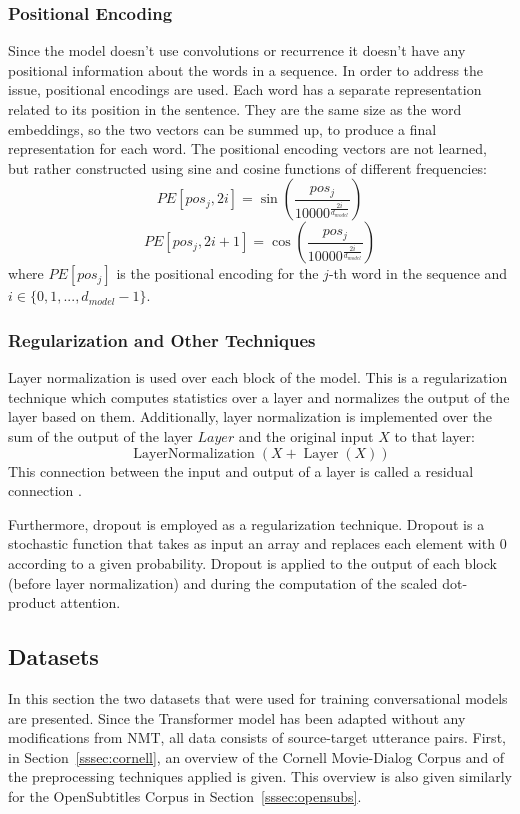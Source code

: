 \documentclass[12pt]{article}
\DeclareMathOperator{\Layer}{Layer}
\DeclareMathOperator{\LayerNormalization}{LayerNormalization}
\begin{document}
\subsubsection{Positional Encoding} \label{sssec:positional}
Since the model doesn't use convolutions or recurrence it doesn't have any positional information about the words in a sequence. In order to address the issue, positional encodings are used. Each word has a separate representation related to its position in the sentence. They are the same size as the word embeddings, so the two vectors can be summed up, to produce a final representation for each word. The positional encoding vectors are not learned, but rather constructed using sine and cosine functions of different frequencies:
\begin{equation}
PE[pos_j,2i]=\sin\left(\frac{pos_j}{10000^{\frac{2i}{d_{model}}}}\right)
\end{equation}
\begin{equation}
PE[pos_j,2i+1]=\cos\left(\frac{pos_j}{10000^{\frac{2i}{d_{model}}}}\right) 
\end{equation}
where \(PE[pos_j]\) is the positional encoding for the \(j\)-th word in the sequence and \(i \in \{0,1,...,d_{model}-1\}\).

\subsubsection{Regularization and Other Techniques} \label{sssec:regularization}
Layer normalization \cite{Ba:2016} is used over each block of the model. This is a regularization technique which computes statistics over a layer and normalizes the output of the layer based on them. Additionally, layer normalization is implemented over the sum of the output of the layer \(Layer\) and the original input \(X\) to that layer:
\begin{equation}
\LayerNormalization(X+\Layer(X))
\end{equation}
This connection between the input and output of a layer is called a residual connection \cite{He:2016}.

Furthermore, dropout \cite{Dropout:2014} is employed as a regularization technique. Dropout is a stochastic function that takes as input an array and replaces each element with 0 according to a given probability. Dropout is applied to the output of each block (before layer normalization) and during the computation of the scaled dot-product attention. 

\subsection{Datasets} \label{ssec:42}
In this section the two datasets that were used for training conversational models are presented. Since the Transformer model has been adapted without any modifications from NMT, all data consists of source-target utterance pairs. First, in Section~\ref{sssec:cornell}, an overview of the Cornell Movie-Dialog Corpus \cite{Danescu:2011} and of the preprocessing techniques applied is given. This overview is also given similarly for the OpenSubtitles Corpus \cite{Tiedemann:2009} in Section~\ref{sssec:opensubs}.
\end{document}
